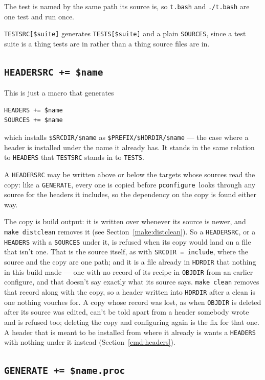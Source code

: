 \documentclass{article}
\newcommand{\pconfigure}{\texttt{pconfigure}}
\begin{document}
The test is named by the same path its source is, so
\texttt{t.bash} and \texttt{./t.bash} are one test and run once.

\texttt{TESTSRC[\$suite]} generates \texttt{TESTS[\$suite]} and a
plain \texttt{SOURCES}, since a test suite is a thing tests are in
rather than a thing source files are in.

\subsection{\texttt{HEADERSRC += \$name} \label{cmd:headersrc}}

This is just a macro that generates
\begin{verbatim}
HEADERS += $name
SOURCES += $name
\end{verbatim}
which installs \texttt{\$SRCDIR/\$name} as
\texttt{\$PREFIX/\$HDRDIR/\$name} --- the case where a header is
installed under the name it already has.  It stands in the same
relation to \texttt{HEADERS} that \texttt{TESTSRC} stands in to
\texttt{TESTS}.

A \texttt{HEADERSRC} may be written above or below the targets whose
sources read the copy: like a \texttt{GENERATE}, every one is copied
before \pconfigure\ looks through any source for the headers it
includes, so the dependency on the copy is found either way.

The copy is build output: it is written over whenever its source is
newer, and \texttt{make distclean} removes it (see
Section~\ref{make:distclean}).  So a \texttt{HEADERSRC}, or a
\texttt{HEADERS} with a \texttt{SOURCES} under it, is refused when
its copy would land on a file that isn't one.  That is the source
itself, as with \texttt{SRCDIR = include}, where the source and the
copy are one path; and it is a file already in \texttt{HDRDIR} that
nothing in this build made --- one with no record of its recipe in
\texttt{OBJDIR} from an earlier configure, and that doesn't say
exactly what its source says.  \texttt{make clean} removes that
record along with the copy, so a header written into \texttt{HDRDIR}
after a clean is one nothing vouches for.  A copy whose record was
lost, as when \texttt{OBJDIR} is deleted after its source was edited,
can't be told apart from a header somebody wrote and is refused too;
deleting the copy and configuring again is the fix for that one.  A
header that is meant to be installed from where it already is wants a
\texttt{HEADERS} with nothing under it instead
(Section~\ref{cmd:headers}).

\subsection{\texttt{GENERATE += \$name.proc}}
\end{document}
